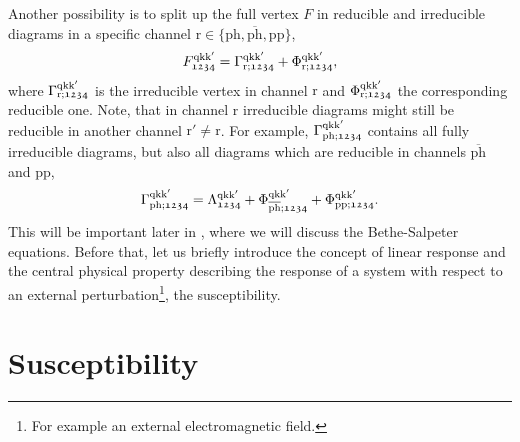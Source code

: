 \documentclass[../../main.tex]{subfiles}
\begin{document}
Another possibility is to split up the full vertex $F$ in reducible and irreducible diagrams in a specific channel $\text{r}\in\{\text{ph},\overline{\text{ph}},\text{pp}\}$,
\begin{align}\label{eq:full_vertex_gamma_phi}
	F_{\mathfrak{1234}}^{\text{q}\text{k}\text{k}'}=\Gamma_{\text{r};\mathfrak{1234}}^{\text{q}\text{k}\text{k}'}+\Phi_{\text{r};\mathfrak{1234}}^{\text{q}\text{k}\text{k}'},
\end{align}
where $\Gamma_{\text{r};\mathfrak{1234}}^{\text{q}\text{k}\text{k}'}$ is the irreducible vertex in channel $\text{r}$ and $\Phi_{\text{r};\mathfrak{1234}}^{\text{q}\text{k}\text{k}'}$ the corresponding reducible one. Note, that in channel $\text{r}$ irreducible diagrams might still be reducible in another channel $\text{r}'\neq \text{r}$. For example, $\Gamma_{\text{ph};\mathfrak{1234}}^{\text{q}\text{k}\text{k}'}$ contains all fully irreducible diagrams, but also all diagrams which are reducible in channels $\overline{\text{ph}}$ and $\text{pp}$,
\begin{align}
	\Gamma_{\text{ph};\mathfrak{1234}}^{\text{q}\text{k}\text{k}'}=\Lambda_{\mathfrak{1234}}^{\text{q}\text{k}\text{k}'}+\Phi_{\overline{\text{ph}};\mathfrak{1234}}^{\text{q}\text{k}\text{k}'}+\Phi_{\text{pp};\mathfrak{1234}}^{\text{q}\text{k}\text{k}'}.
\end{align}
This will be important later in , where we will discuss the Bethe-Salpeter equations. Before that, let us briefly introduce the concept of linear response and the central physical property describing the response of a system with respect to an external perturbation\footnote{For example an external electromagnetic field.}, the susceptibility.

\section{Susceptibility}
\end{document}
